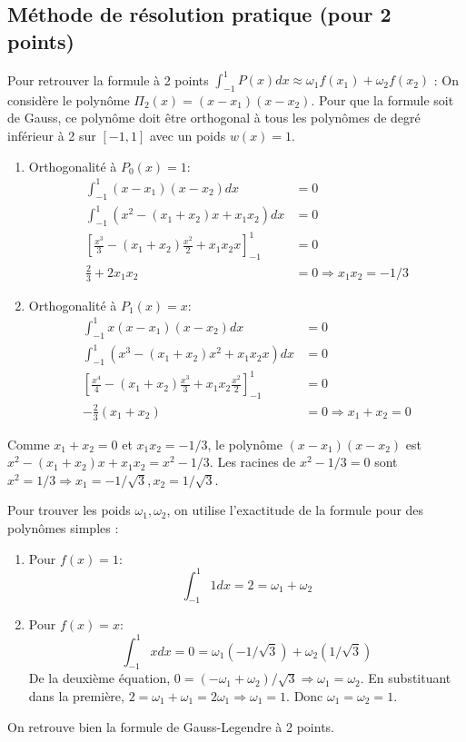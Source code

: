 \subsection{Méthode de résolution pratique (pour 2 points)}
Pour retrouver la formule à 2 points $\int_{-1}^{1} P(x) dx \approx \omega_1 f(x_1) + \omega_2 f(x_2)$ :
On considère le polynôme $\Pi_2(x) = (x-x_1)(x-x_2)$. Pour que la formule soit de Gauss, ce polynôme doit être orthogonal à tous les polynômes de degré inférieur à 2 sur $[-1,1]$ avec un poids $w(x)=1$.
\begin{enumerate}
    \item Orthogonalité à $P_0(x)=1$:
    \begin{align*} \int_{-1}^{1} (x-x_1)(x-x_2) dx &= 0 \\ \int_{-1}^{1} (x^2 - (x_1+x_2)x + x_1x_2) dx &= 0 \\ \left[ \frac{x^3}{3} - (x_1+x_2)\frac{x^2}{2} + x_1x_2 x \right]_{-1}^{1} &= 0 \\ \frac{2}{3} + 2x_1x_2 &= 0 \Rightarrow x_1x_2 = -1/3 \end{align*}
    \item Orthogonalité à $P_1(x)=x$:
    \begin{align*} \int_{-1}^{1} x(x-x_1)(x-x_2) dx &= 0 \\ \int_{-1}^{1} (x^3 - (x_1+x_2)x^2 + x_1x_2 x) dx &= 0 \\ \left[ \frac{x^4}{4} - (x_1+x_2)\frac{x^3}{3} + x_1x_2 \frac{x^2}{2} \right]_{-1}^{1} &= 0 \\ -\frac{2}{3}(x_1+x_2) &= 0 \Rightarrow x_1+x_2 = 0 \end{align*}
\end{enumerate}
Comme $x_1+x_2=0$ et $x_1x_2=-1/3$, le polynôme $(x-x_1)(x-x_2)$ est $x^2 - (x_1+x_2)x + x_1x_2 = x^2 - 1/3$.
Les racines de $x^2-1/3=0$ sont $x^2=1/3 \Rightarrow x_1 = -1/\sqrt{3}, x_2 = 1/\sqrt{3}$.

Pour trouver les poids $\omega_1, \omega_2$, on utilise l'exactitude de la formule pour des polynômes simples :
\begin{enumerate}
    \item Pour $f(x)=1$:
    \[ \int_{-1}^{1} 1 dx = 2 = \omega_1 + \omega_2 \]
    \item Pour $f(x)=x$:
    \[ \int_{-1}^{1} x dx = 0 = \omega_1(-1/\sqrt{3}) + \omega_2(1/\sqrt{3}) \]
    De la deuxième équation, $0 = (- \omega_1 + \omega_2)/\sqrt{3} \Rightarrow \omega_1 = \omega_2$.
    En substituant dans la première, $2 = \omega_1 + \omega_1 = 2\omega_1 \Rightarrow \omega_1 = 1$.
    Donc $\omega_1 = \omega_2 = 1$.
\end{enumerate}
On retrouve bien la formule de Gauss-Legendre à 2 points.

